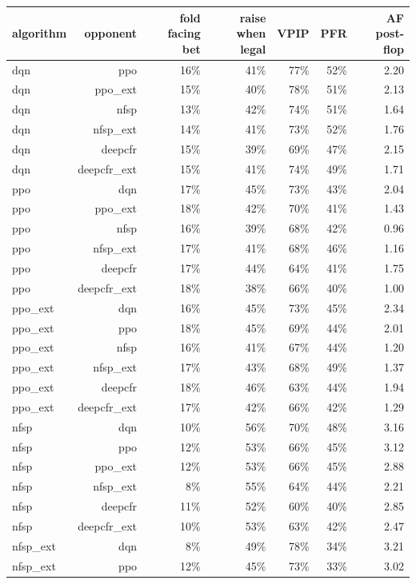 \begin{tabular}{lrrrrrr}
\toprule
algorithm & opponent & fold facing bet & raise when legal & VPIP & PFR & AF post-flop \\
\midrule
dqn & ppo & 16\% & 41\% & 77\% & 52\% & 2.20 \\
dqn & ppo\_ext & 15\% & 40\% & 78\% & 51\% & 2.13 \\
dqn & nfsp & 13\% & 42\% & 74\% & 51\% & 1.64 \\
dqn & nfsp\_ext & 14\% & 41\% & 73\% & 52\% & 1.76 \\
dqn & deepcfr & 15\% & 39\% & 69\% & 47\% & 2.15 \\
dqn & deepcfr\_ext & 15\% & 41\% & 74\% & 49\% & 1.71 \\
ppo & dqn & 17\% & 45\% & 73\% & 43\% & 2.04 \\
ppo & ppo\_ext & 18\% & 42\% & 70\% & 41\% & 1.43 \\
ppo & nfsp & 16\% & 39\% & 68\% & 42\% & 0.96 \\
ppo & nfsp\_ext & 17\% & 41\% & 68\% & 46\% & 1.16 \\
ppo & deepcfr & 17\% & 44\% & 64\% & 41\% & 1.75 \\
ppo & deepcfr\_ext & 18\% & 38\% & 66\% & 40\% & 1.00 \\
ppo\_ext & dqn & 16\% & 45\% & 73\% & 45\% & 2.34 \\
ppo\_ext & ppo & 18\% & 45\% & 69\% & 44\% & 2.01 \\
ppo\_ext & nfsp & 16\% & 41\% & 67\% & 44\% & 1.20 \\
ppo\_ext & nfsp\_ext & 17\% & 43\% & 68\% & 49\% & 1.37 \\
ppo\_ext & deepcfr & 18\% & 46\% & 63\% & 44\% & 1.94 \\
ppo\_ext & deepcfr\_ext & 17\% & 42\% & 66\% & 42\% & 1.29 \\
nfsp & dqn & 10\% & 56\% & 70\% & 48\% & 3.16 \\
nfsp & ppo & 12\% & 53\% & 66\% & 45\% & 3.12 \\
nfsp & ppo\_ext & 12\% & 53\% & 66\% & 45\% & 2.88 \\
nfsp & nfsp\_ext & 8\% & 55\% & 64\% & 44\% & 2.21 \\
nfsp & deepcfr & 11\% & 52\% & 60\% & 40\% & 2.85 \\
nfsp & deepcfr\_ext & 10\% & 53\% & 63\% & 42\% & 2.47 \\
nfsp\_ext & dqn & 8\% & 49\% & 78\% & 34\% & 3.21 \\
nfsp\_ext & ppo & 12\% & 45\% & 73\% & 33\% & 3.02 \\

\end{tabular}
